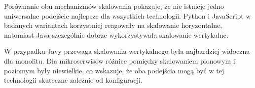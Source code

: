 \begin{table}[H]
    \centering
    \caption{Porównanie skuteczności skalowania horyzontalnego i wertykalnego. Dodatnia wartość oznacza przewagę skalowania wertykalnego, a ujemna przewagę skalowania horyzontalnego}
    \label{tab:horizontal-vs-vertical-results}
    \renewcommand{\arraystretch}{1.15}
\end{table}

Porównanie obu mechanizmów skalowania pokazuje, że nie istnieje jedno uniwersalne podejście najlepsze dla wszystkich technologii. Python i JavaScript w badanych wariantach korzystniej reagowały na skalowanie horyzontalne, natomiast Java szczególnie dobrze wykorzystywała skalowanie wertykalne.

W przypadku Javy przewaga skalowania wertykalnego była najbardziej widoczna dla monolitu. Dla mikroserwisów różnice pomiędzy skalowaniem pionowym i poziomym były niewielkie, co wskazuje, że oba podejścia mogą być w tej technologii skuteczne zależnie od konfiguracji.

